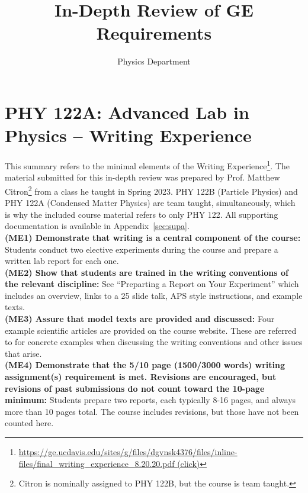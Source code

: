 \documentclass[12pt]{article}
\begin{document}

\title{In-Depth Review of GE Requirements}
\author{Physics Department}

\maketitle


%


\newpage
\section{PHY 122A:  Advanced Lab in Physics -- Writing Experience}

This summary refers to the minimal elements of the Writing
Experience\footnote{
\href{https://ge.ucdavis.edu/sites/g/files/dgvnsk4376/files/inline-files/final\_writing\_experience\_8.20.20.pdf}{https://ge.ucdavis.edu/sites/g/files/dgvnsk4376/files/inline-files/final\_writing\_experience\_8.20.20.pdf (click)}}.  The material submitted for this in-depth review was prepared by Prof. Matthew
Citron\footnote{Citron is nominally assigned to PHY 122B, but the course is team taught.}
from a class he taught in Spring 2023.  PHY 122B (Particle
Physics) and PHY 122A (Condensed Matter Physics) are team taught,
simultaneously, which is why the included course material refers
to only PHY 122.  All supporting documentation is available in Appendix~\ref{sec:supa}.\\

\noindent
{\bf (ME1) Demonstrate that writing is a central component of the course:}
Students conduct two elective experiments during the course and prepare a written lab
report for each one.\\[1pt]

\noindent
{\bf (ME2) Show that students are trained in the writing conventions of the relevant discipline:}
See ``Preparting a Report on Your Experiment'' which includes an overview, links to a 25 slide talk, APS style instructions, and example texts. \\[1pt]

\noindent
{\bf (ME3) Assure that model texts are provided and discussed:}
Four example scientific articles are provided on the course website.  These are referred to for concrete examples when discussing the writing conventions and other issues that arise.\\[1pt]

\noindent
{\bf (ME4) Demonstrate that the 5/10 page (1500/3000 words) writing assignment(s) requirement is met. Revisions are encouraged, but revisions of past submissions do not count toward the 10-page minimum:} 
Students prepare two reports, each typically 8-16 pages, and always more than 10 pages total.  The course includes revisions, but those have not been counted here.\\[1pt]
\end{document}
